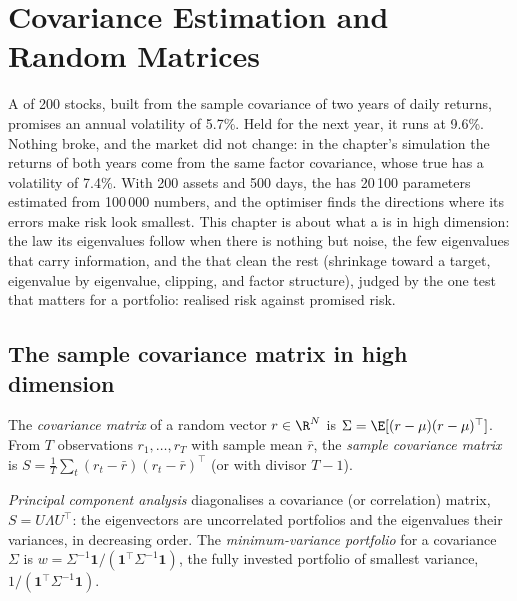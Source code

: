 \chapter{Covariance Estimation and Random Matrices}\label{ch:qm:covariance-estimation-and-random-matrices}

A  of 200 stocks, built from the sample covariance of two years of daily returns, promises an annual volatility of
5.7\%. Held for the next year, it runs at 9.6\%. Nothing broke, and the market did not change: in the chapter's simulation the returns of both years
come from the same factor covariance, whose true  has a volatility of 7.4\%. With 200 assets and 500 days, the  has 20\,100 parameters estimated from 100\,000 numbers, and the optimiser finds the directions where its errors make risk look
smallest. This chapter is about what a  is in high dimension: the law its eigenvalues follow when there is nothing but noise,
the few eigenvalues that carry information, and the  that clean the rest (shrinkage toward a target, eigenvalue by eigenvalue, clipping,
and factor structure), judged by the one test that matters for a portfolio: realised risk against promised risk.

\section{The sample covariance matrix in high dimension}

\begin{definition}\label{def:qm:covariance-estimation-and-random-matrices:cov}
The \emph{covariance matrix} of a random vector $r \in \R^N$ is $\Sigma = \E[(r - \mu)(r - \mu)^\top]$. From $T$ observations $r_1, \dots, r_T$
with sample mean $\bar r$, the \emph{sample covariance matrix} is $S = \frac1T\sum_t(r_t - \bar r)(r_t - \bar r)^\top$ (or with divisor
$T - 1$).
\end{definition}

\begin{definition}\label{def:qm:covariance-estimation-and-random-matrices:pca}
\emph{Principal component analysis} diagonalises a covariance (or correlation) matrix, $S = U\Lambda U^\top$: the eigenvectors are
uncorrelated portfolios and the eigenvalues their variances, in decreasing order. The \emph{minimum-variance portfolio} for a
covariance $\Sigma$ is $w = \Sigma^{-1}\mathbf 1/(\mathbf 1^\top\Sigma^{-1}\mathbf 1)$, the fully invested portfolio of smallest variance, $1/(\mathbf 1^\top\Sigma^{-1}\mathbf 1)$.
\end{definition}

